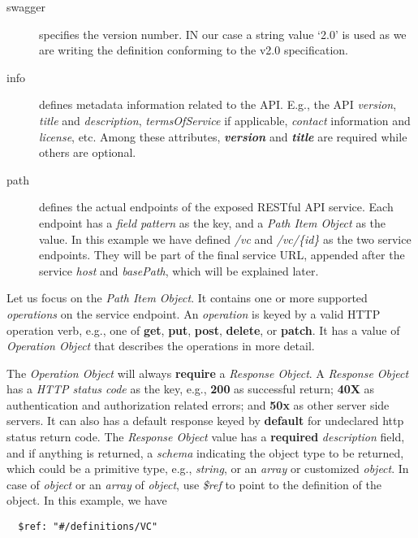 \begin{description}
\item[swagger] specifies the version number. IN our case a string
  value `2.0' is used as we are writing the definition conforming to
  the v2.0 specification.
\item [info] defines metadata information related to the API.  E.g.,
  the API \emph{version}, \emph{title} and \emph{description},
  \emph{termsOfService} if applicable, \emph{contact} information and
  \emph{license}, etc. Among these attributes, \textbf{\emph{version}}
  and \textbf{\emph{title}} are required while others are optional.
\item[path] defines the actual endpoints of the exposed RESTful API
  service. Each endpoint has a \emph{field pattern} as the key, and a
  \emph{Path Item Object} as the value. In this example we have defined
  \emph{/vc} and \emph{/vc/\{id\}} as the two service endpoints. They
  will be part of the final service URL, appended after the service
  \emph{host} and \emph{basePath}, which will be explained later.
\end{description}

Let us focus on the \emph{Path Item Object}. It contains one
or more supported \emph{operations} on the service endpoint. An
\emph{operation} is keyed by a valid HTTP operation verb, e.g., one of
\textbf{get}, \textbf{put}, \textbf{post}, \textbf{delete}, or
\textbf{patch}. It has a value of
\emph{Operation Object} that describes the operations in more detail.

The \emph{Operation Object} will always \textbf{require} a
\emph{Response Object}. A \emph{Response Object} has a \emph{HTTP status
code} as the key, e.g., \textbf{200} as successful return; \textbf{40X}
as authentication and authorization related errors; and \textbf{50x} as
other server side servers. It can also has a default response keyed by
\textbf{default} for undeclared http status return code. The
\emph{Response Object} value has a \textbf{required} \emph{description}
field, and if anything is returned, a \emph{schema} indicating the
object type to be returned, which could be a primitive type, e.g.,
\emph{string}, or an \emph{array} or customized \emph{object}. In case
of \emph{object} or an \emph{array} of \emph{object}, use \emph{\$ref}
to point to the definition of the object. In this example, we have

\begin{lstlisting}
  $ref: "#/definitions/VC"
\end{lstlisting}

